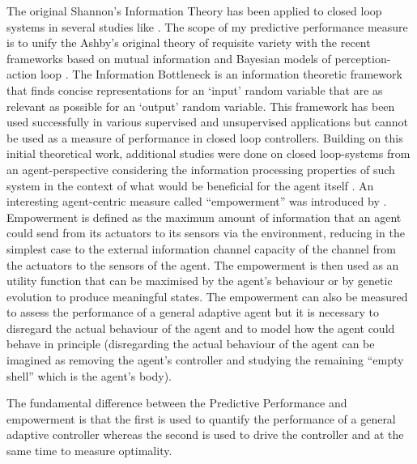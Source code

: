 The original Shannon's Information Theory \citep{Shannon76} has been applied
to closed loop systems in several studies like \citet{Ashby1956:IntroCybernetics,Tishby1999:InfoBottle,TouchetteLloyd2004}.
The scope of my predictive performance measure is to unify the Ashby's original theory of requisite variety \citet{Ashby1956:IntroCybernetics}
with the recent frameworks based on mutual information \citep{Tishby1999:InfoBottle} and Bayesian models of perception-action loop \citet{Klyubin2004:Organization,Klyubin2005:Empowerment,Klyubin2007:Representation,Klyubin2008:KeepOptions}.
The Information Bottleneck \citep{Tishby1999:InfoBottle} is an information theoretic framework that finds concise
representations for an `input' random variable that are as relevant as possible for an `output' random variable.
This framework has been used successfully in various supervised and unsupervised applications but cannot be used
as a measure of performance in closed loop controllers.
Building on this initial theoretical work, additional studies were done on
closed loop-systems from an agent-perspective considering the information
 processing properties of such system in the context of what would be
 beneficial for the agent itself \citep{Klyubin2007:Representation,Klyubin2008:KeepOptions,Prokopenko2006:EvolveCoordination,
LungarellaInformationStructure,LungarellaSporns2006:MappingFlow}.
An interesting agent-centric measure called ``empowerment'' was introduced by \citet{Klyubin2005:Empowerment,Klyubin2008:KeepOptions}.
Empowerment is defined as the maximum amount of information that an agent could
send from its actuators to its sensors via the environment, reducing in the simplest
case to the external information channel capacity of the channel from the actuators
to the sensors of the agent.
The empowerment is then used as an utility function that can be maximised
 by the agent's behaviour or by genetic evolution to produce meaningful states.
The empowerment can also be measured  to assess the performance of a general
adaptive agent but it is necessary to disregard the actual behaviour of the agent
and to model how the agent could behave in principle (disregarding the actual
behaviour of the agent can be imagined as removing the agent's controller and
studying the remaining “empty shell” which is the agent's body).

The fundamental difference between the Predictive Performance and empowerment is that
the first is used to quantify the performance of a general adaptive controller
whereas the second is used to drive the controller and at the same time to measure optimality.

